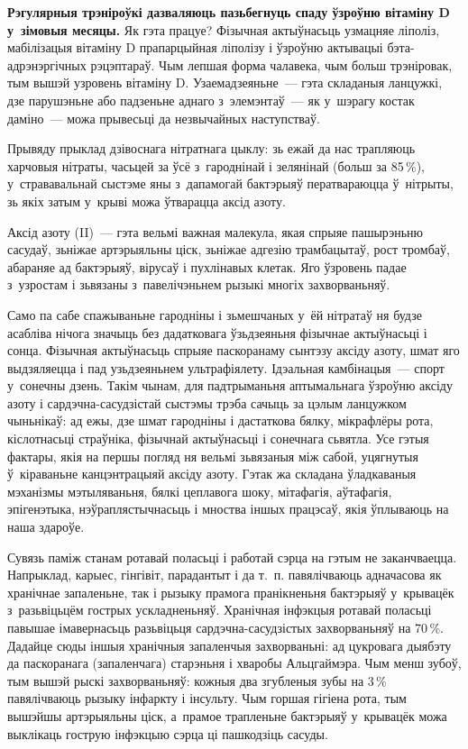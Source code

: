 \textbf{Рэгулярныя трэніроўкі дазваляюць пазьбегнуць спаду ўзроўню вітаміну D у~зімовыя месяцы.} Як гэта працуе? Фізычная актыўнасьць узмацняе ліполіз, мабілізацыя вітаміну D прапарцыйная ліполізу і ўзроўню актывацыі бэта-адрэнэргічных рэцэптараў. Чым лепшая форма чалавека, чым больш трэніровак, тым вышэй узровень вітаміну D. Узаемадзеяньне~--- гэта складаныя ланцужкі, дзе парушэньне або падзеньне аднаго з~элемэнтаў~--- як у~шэрагу костак даміно~--- можа прывесьці да незвычайных наступстваў.

Прывяду прыклад дзівоснага нітратнага цыклу: зь ежай да нас трапляюць харчовыя нітраты, часьцей за ўсё з~гароднінай і зелянінай (больш за 85\,\%), у~стрававальнай сыстэме яны з~дапамогай бактэрыяў ператвараюцца ў~нітрыты, зь якіх затым у~крыві можа ўтварацца аксід азоту. 

Аксід азоту (II)~--- гэта вельмі важная малекула, якая спрыяе пашырэньню сасудаў, зьніжае артэрыяльны ціск, зьніжае адгезію трамбацытаў, рост тромбаў, абараняе ад бактэрыяў, вірусаў і пухлінавых клетак. Яго ўзровень падае з~узростам і зьвязаны з~павелічэньнем рызыкі многіх захворваньняў.

Само па сабе спажываньне гародніны і зьмешчаных у~ёй нітратаў ня будзе асабліва нічога значыць без дадатковага ўзьдзеяньня фізычнае актыўнасьці і сонца. Фізычная актыўнасьць спрыяе паскоранаму сынтэзу аксіду азоту, шмат яго выдзяляецца і пад узьдзеяньнем ультрафіялету. Ідэальная камбінацыя~--- спорт у~сонечны дзень. Такім чынам, для падтрыманьня аптымальнага ўзроўню аксіду азоту і сардэчна-сасудзістай сыстэмы трэба сачыць за цэлым ланцужком чыньнікаў: ад ежы, дзе шмат гародніны і дастаткова бялку, мікрафлёры рота, кіслотнасьці страўніка, фізычнай актыўнасьці і сонечнага сьвятла. Усе гэтыя фактары, якія на першы погляд ня вельмі зьвязаныя між сабой, уцягнутыя ў~кіраваньне канцэнтрацыяй аксіду азоту. Гэтак жа складана ўладкаваныя мэханізмы мэтыляваньня, бялкі цеплавога шоку, мітафагія, аўтафагія, эпігенэтыка, нэўраплястычнасьць і мноства іншых працэсаў, якія ўплываюць на наша здароўе.

Сувязь паміж станам ротавай поласьці і работай сэрца на гэтым не заканчваецца. Напрыклад, карыес, гінгівіт, парадантыт і да т.~п. павялічваюць адначасова як хранічнае запаленьне, так і рызыку прамога пранікненьня бактэрыяў у~крывацёк з~разьвіцьцём гострых ускладненьняў. Хранічная інфэкцыя ротавай поласьці павышае імавернасьць разьвіцьця сардэчна-сасудзістых захворваньняў на 70\,\%. Дадайце сюды іншыя хранічныя запаленчыя захворваньні: ад цукровага дыябэту да паскоранага (запаленчага) старэньня і хваробы Альцгаймэра. Чым менш зубоў, тым вышэй рыскі захворваньняў: кожныя два згубленыя зубы на 3\,\% павялічваюць рызыку інфаркту і інсульту. Чым горшая гігіена рота, тым вышэйшы артэрыяльны ціск, а~прамое трапленьне бактэрыяў у~крывацёк можа выклікаць гострую інфэкцыю сэрца ці пашкодзіць сасуды.

